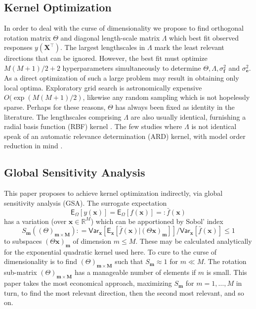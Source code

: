 \documentclass[preprint,12pt]{elsarticle}
\newcommand*{\M}[1]{\ensuremath{#1}\xspace}
\newcommand*{\vr}[1]{\M{\mathbf{#1}}}
\newcommand*{\st}[1]{\M{\mathbb{#1}}}
\newcommand*{\deq}{\M{\mathrel{\mathop:}=}}
\newcommand*{\deqr}{\M{=\mathrel{\mathop:}}}
\newcommand*{\ev}[2][]{\mathsf{E}_{#1}\!\left\lbrack{} #2 \right\rbrack}
\newcommand*{\var}[2][]{\mathsf{Var}_{#1}\!\left\lbrack{} #2 \right\rbrack}
\begin{document}
        \subsection{Kernel Optimization}
            In order to deal with the curse of dimensionality we propose to find orthogonal rotation matrix $\Theta$ and diagonal length-scale matrix $\Lambda$ which best fit observed responses $y(\vr{X}^{\intercal})$. The largest lengthscales in $\Lambda$ mark the least relevant directions that can be ignored. However, the best fit must optimize $M(M+1)/2+2$ hyperparameters simultaneously to determine $\Theta, \Lambda, \sigma^{2}_\vr{f}$ and $\sigma^{2}_\vr{e}$. As a direct optimization of such a large problem may result in obtaining only local optima. Exploratory grid search is astronomically expensive $O(\exp(M(M+1)/2)$, likewise any random sampling which is not hopelessly sparse. Perhaps for these reasons, $\Theta$ has always been fixed as identity in the literature. The lengthscales comprising $\Lambda$ are also usually identical, furnishing a radial basis function (RBF) kernel \cite{Sacks.etal1989}. The few studies where $\Lambda$ is not identical speak of an automatic relevance determination (ARD) kernel, with model order reduction in mind \cite{Wipf.Nagarajan2007, Neal1996}.

        \subsection{Global Sensitivity Analysis}
            This paper proposes to achieve kernel optimization indirectly, via global sensitivity analysis (GSA).
            The surrogate expectation
            \begin{equation*}
                \ev[\Omega]{y(\vr{x})} = \ev[\Omega]{f(\vr{x})} \deqr \bar{f}(\vr{x})
            \end{equation*}
            has a variation (over $\vr{x} \in \st{R}^{M}$) which can be apportioned by Sobol' index
            \begin{equation*}
                S_{\vr{m}}((\Theta)_{\vr{m}\times\vr{M}}) \deq \var[\vr{x}]{\ev[\vr{x}]{\bar{f}(\vr{x}) \vert (\Theta \vr{x})_{\vr{m}}}} / \var[\vr{x}]{\bar{f}(\vr{x})} \leq 1
            \end{equation*}
            to subspaces $(\Theta \vr{x})_{\vr{m}}$ of dimension $m\leq M$. These may be calculated analytically for the exponential quadratic kernel used here. To cure to the curse of dimensionality is to find $(\Theta)_{\vr{m}\times\vr{M}}$ such that $S_{\vr{m}} \approx 1$ for $m\ll M$. The rotation sub-matrix $(\Theta)_{\vr{m}\times\vr{M}}$ has a manageable number of elements if $m$ is small. This paper takes the most economical approach, maximizing $S_{\vr{m}}$ for $m=1,\ldots,M$ in turn, to find the most relevant direction, then the second most relevant, and so on. 
\end{document}
